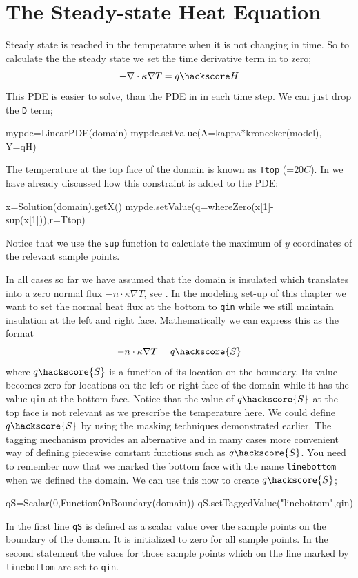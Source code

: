 \section{The Steady-state Heat Equation}

Steady state is reached in the temperature when it is not changing in time. So to calculate the 
the steady state we set the time derivative term in  to zero;
\begin{equation}\label{eqn:Tform nabla steady}
-\nabla \cdot \kappa \nabla T = q\hackscore H
\end{equation}
This PDE is easier to solve, than the PDE in  in each time step. We can just drop
the \verb|D| term;
\begin{python}
mypde=LinearPDE(domain)
mypde.setValue(A=kappa*kronecker(model), Y=qH)
\end{python}
The temperature at the top face of the domain is known as \verb|Ttop| (=$20 C$). In  we have 
already discussed how this constraint is added to the PDE:
\begin{python}
x=Solution(domain).getX()
mypde.setValue(q=whereZero(x[1]-sup(x[1])),r=Ttop)
\end{python}
Notice that we use the \verb|sup| function to calculate the maximum of $y$ coordinates of the relevant sample points.

In all cases so far we have assumed that the domain is insulated which translates 
into a zero normal flux $-n \cdot \kappa \nabla T$, see . In the modeling
set-up of this chapter we want to set the normal heat flux at the bottom to \verb|qin| while we still
maintain insulation at the left and right face. Mathematically we can express this as the format
\begin{equation}
-n \cdot \kappa \nabla T = q\hackscore{S}
\label{eq:inhom flux}
\end{equation}
where $q\hackscore{S}$ is a function of its location on the boundary. Its value becomes zero
for locations on the left or right face of the domain while it has the value \verb|qin| at the bottom face.
Notice that the value of $q\hackscore{S}$ at the top face is not relevant as we prescribe the temperature here.
We could define $q\hackscore{S}$ by using the masking techniques demonstrated earlier. The tagging mechanism provides an alternative and in many cases more convenient way of defining piecewise 
constant functions such as $q\hackscore{S}$. You need to remember now that we
marked the bottom face with the name \verb|linebottom| when we defined the domain. 
We can use this now to create $q\hackscore{S}$;
\begin{python}
qS=Scalar(0,FunctionOnBoundary(domain))
qS.setTaggedValue("linebottom",qin)
\end{python}
In the first line \verb|qS| is defined as a scalar value over the sample points on the boundary of the domain. It is
initialized to zero for all sample points. In the second statement the values for those sample points which
on the line marked by \verb|linebottom| are set to \verb|qin|. 

